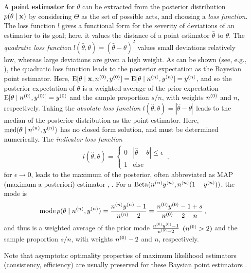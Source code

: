A \textbf{point estimator} for $\theta$ can be extracted from the posterior distribution $p(\theta\mid\mathbf{x})$
by considering $\Theta$ as the set of possible acts, and choosing a \emph{loss function}.
The loss function $l$ gives a functional form for the severity of deviations of an estimator to its goal;
here, it values the distance of a point estimator $\hat{\theta}$ to $\theta$.
The \emph{quadratic loss function} $l(\hat{\theta}, \theta) = (\hat{\theta}-\theta)^2$
values small deviations relatively low, whereas large deviations are given a high weight.
As can be shown (see, e.g., \cite[p.~352f]{2002:casella}),
the quadratic loss function leads to the posterior expectation as the Bayesian point estimator.
Here, $\operatorname{E}[\theta\mid\mathbf{x}, n^{(0)}, y^{(0)}] = \operatorname{E}[\theta\mid n^{(n)}, y^{(n)}] = y^{(n)}$,
and so the posterior expectation of $\theta$ is a weighted average
of the prior expectation $\operatorname{E}[\theta\mid n^{(0)}, y^{(0)}] = y^{(0)}$ and the sample proportion $s/n$, with weights $n^{(0)}$ and $n$, respectively.
Taking the \emph{absolute loss function} $l(\hat{\theta}, \theta) = |\hat{\theta}-\theta|$
leads to the median of the posterior distribution as the point estimator.
Here, $\operatorname{med}(\theta\mid n^{(n)}, y^{(n)})$ has no closed form solution, and must be determined numerically.
The \emph{indicator loss function}
\begin{align*}
l(\hat{\theta}, \theta) = \begin{cases} 0 & |\hat{\theta}-\theta| \le \epsilon \\ 1 & \text{else}\end{cases}\,,
\end{align*}
for $\epsilon \rightarrow 0$, leads to the maximum of the posterior,
often abbreviated as MAP (maximum a posteriori) estimator \cite[\S 5.1.5, p.~257]{2000:bernardosmith}, \cite[\S 4.1.2, p.~166]{2007:robert}.
For a $\operatorname{Beta}(n^{(n)}y^{(n)}, n^{(n)}(1-y^{(n)}))$, the mode is
\begin{align*}
\operatorname{mode} p(\theta\mid n^{(n)}, y^{(n)}) &= \frac{n^{(n)}y^{(n)} - 1}{n^{(n)} - 2} = \frac{n^{(0)}y^{(0)} - 1 + s}{n^{(0)} - 2 + n}\,,
\end{align*}
and thus is a weighted average of the prior mode $\frac{n^{(0)}y^{(0)} - 1}{n^{(0)} -2}$ $(n^{(0)} > 2)$
and the sample proportion $s/n$, with weights $n^{(0)} - 2$ and $n$, respectively.

Note that asymptotic optimality properties of maximum likelihood estimators (consistency, efficiency)
are usually preserved for these Baysian point estimators \cite[Note~1.8.4, p.~48f]{2007:robert}.

